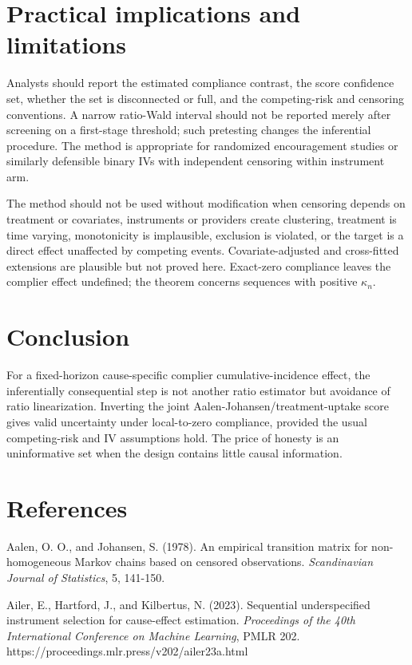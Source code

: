 \documentclass[
  10pt,
  letterpaper,
]{article}
\begin{document}
\section{Practical implications and limitations}

Analysts should report the estimated compliance contrast, the score
confidence set, whether the set is disconnected or full, and the
competing-risk and censoring conventions. A narrow ratio-Wald interval
should not be reported merely after screening on a first-stage
threshold; such pretesting changes the inferential procedure. The method
is appropriate for randomized encouragement studies or similarly
defensible binary IVs with independent censoring within instrument arm.

The method should not be used without modification when censoring
depends on treatment or covariates, instruments or providers create
clustering, treatment is time varying, monotonicity is implausible,
exclusion is violated, or the target is a direct effect unaffected by
competing events. Covariate-adjusted and cross-fitted extensions are
plausible but not proved here. Exact-zero compliance leaves the complier
effect undefined; the theorem concerns sequences with positive $\kappa_n$.

\section{Conclusion}

For a fixed-horizon cause-specific complier cumulative-incidence effect,
the inferentially consequential step is not another ratio estimator but
avoidance of ratio linearization. Inverting the joint
Aalen-Johansen/treatment-uptake score gives valid uncertainty under
local-to-zero compliance, provided the usual competing-risk and IV
assumptions hold. The price of honesty is an uninformative set when the
design contains little causal information.

\section*{References}

Aalen, O. O., and Johansen, S. (1978). An empirical transition matrix
for non-homogeneous Markov chains based on censored observations.
\emph{Scandinavian Journal of Statistics}, 5, 141-150.

Ailer, E., Hartford, J., and Kilbertus, N. (2023). Sequential
underspecified instrument selection for cause-effect estimation.
\emph{Proceedings of the 40th International Conference on Machine
Learning}, PMLR 202. https://proceedings.mlr.press/v202/ailer23a.html
\end{document}
